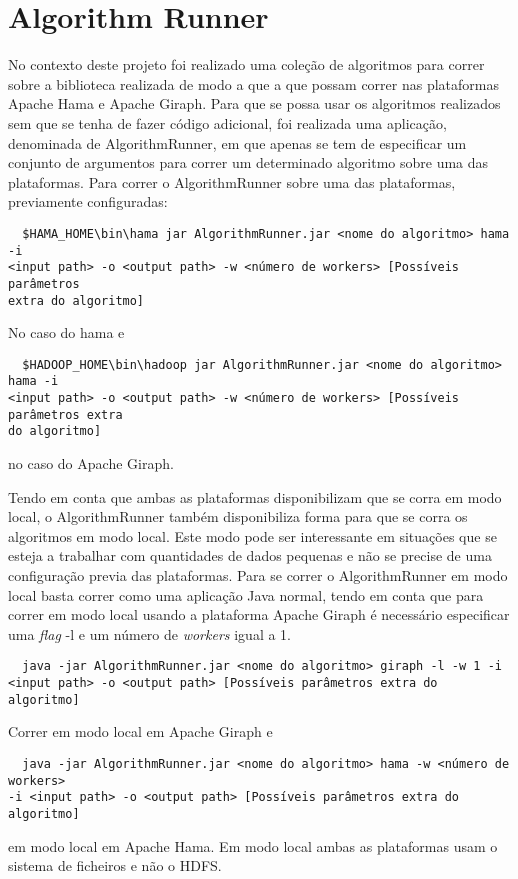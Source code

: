 	\chapter{Algorithm Runner}
  No contexto deste projeto foi realizado uma coleção de algoritmos para 
correr sobre a biblioteca realizada de modo a que a que possam correr nas 
plataformas Apache Hama e Apache Giraph. Para que se possa usar os algoritmos 
realizados sem que se tenha de fazer código adicional, foi realizada uma 
aplicação, denominada de AlgorithmRunner, em que apenas se tem de especificar um 
conjunto de argumentos para correr um determinado algoritmo sobre uma das 
plataformas.
  Para correr o AlgorithmRunner sobre uma das plataformas, previamente 
configuradas:
  \begin{verbatim}
  $HAMA_HOME\bin\hama jar AlgorithmRunner.jar <nome do algoritmo> hama -i 
<input path> -o <output path> -w <número de workers> [Possíveis parâmetros 
extra do algoritmo]
  \end{verbatim}
  No caso do hama e
  \begin{verbatim}
  $HADOOP_HOME\bin\hadoop jar AlgorithmRunner.jar <nome do algoritmo> hama -i 
<input path> -o <output path> -w <número de workers> [Possíveis parâmetros extra 
do algoritmo]
  \end{verbatim}
  no caso do Apache Giraph.
  
  Tendo em conta que ambas as plataformas disponibilizam que se corra em modo 
local, o AlgorithmRunner também disponibiliza forma para que se corra os 
algoritmos em modo local. Este modo pode ser interessante em situações que se 
esteja a trabalhar com quantidades de dados pequenas e não se precise de uma 
configuração previa das plataformas. Para se correr o AlgorithmRunner em modo 
local basta correr como uma aplicação Java normal, tendo em conta que para 
correr em modo local usando a plataforma Apache Giraph é necessário especificar 
uma \textit{flag} -l e um número de \textit{workers} igual a 1.
\begin{verbatim}
  java -jar AlgorithmRunner.jar <nome do algoritmo> giraph -l -w 1 -i 
<input path> -o <output path> [Possíveis parâmetros extra do algoritmo]
  \end{verbatim}
Correr em modo local em Apache Giraph e
\begin{verbatim}
  java -jar AlgorithmRunner.jar <nome do algoritmo> hama -w <número de workers> 
-i <input path> -o <output path> [Possíveis parâmetros extra do algoritmo]
  \end{verbatim}
em modo local em Apache Hama. Em modo local ambas as plataformas usam o sistema 
de ficheiros e não o HDFS.